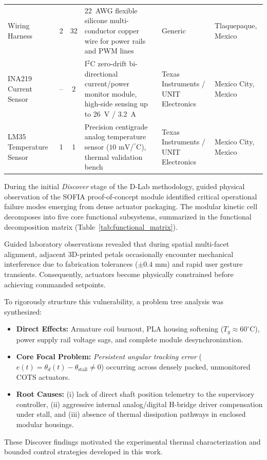 \documentclass[lettersize,journal]{IEEEtran}
\begin{document}
\begin{table}[t]
\begin{tabular}{p{3.2cm} c c p{5.0cm} p{2.8cm} p{2.5cm}}
			Wiring Harness & 2 & 32 & 22~AWG flexible silicone multi-conductor copper wire for power rails and PWM lines & Generic & Tlaquepaque, Mexico \\
			
			INA219 Current Sensor & -- & 2 & I$^2$C zero-drift bi-directional current/power monitor module, high-side sensing up to 26~V / 3.2~A & Texas Instruments / UNIT Electronics & Mexico City, Mexico \\
			
			LM35 Temperature Sensor & 1 & 1 & Precision centigrade analog temperature sensor ($10\text{ mV}/^\circ\text{C}$), thermal validation bench & Texas Instruments / UNIT Electronics & Mexico City, Mexico \\
			\bottomrule
		\end{tabular}
	\end{table}
	
	During the initial \textit{Discover} stage of the D-Lab methodology, guided physical observation of the SOFIA proof-of-concept module identified critical operational failure modes emerging from dense actuator packaging. The modular kinetic cell decomposes into five core functional subsystems, summarized in the functional decomposition matrix (Table~\ref{tab:functional_matrix}).
	
	Guided laboratory observations revealed that during spatial multi-facet alignment, adjacent 3D-printed petals occasionally encounter mechanical interference due to fabrication tolerances ($\pm 0.4\text{ mm}$) and rapid user gesture transients. Consequently, actuators become physically constrained before achieving commanded setpoints. 
	
	To rigorously structure this vulnerability, a problem tree analysis was synthesized:
	\begin{itemize}
		\item \textbf{Direct Effects:} Armature coil burnout, PLA housing softening ($T_g \approx 60^\circ\text{C}$), power supply rail voltage sags, and complete module desynchronization.
		\item \textbf{Core Focal Problem:} \textit{Persistent angular tracking error} ($e(t) = \theta_d(t) - \theta_{\text{stall}} \neq 0$) occurring across densely packed, unmonitored COTS actuators.
		\item \textbf{Root Causes:} (i) lack of direct shaft position telemetry to the supervisory controller, (ii) aggressive internal analog/digital H-bridge driver compensation under stall, and (iii) absence of thermal dissipation pathways in enclosed modular housings.
	\end{itemize}
	These Discover findings motivated the experimental thermal characterization and bounded control strategies developed in this work.
	
\end{document}
